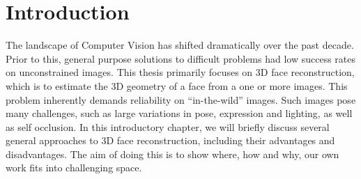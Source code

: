 \chapter{Introduction}

The landscape of Computer Vision has shifted dramatically over the
past decade. Prior to this, general purpose solutions to difficult
problems had low success rates on unconstrained images. This thesis
primarily focuses on 3D face reconstruction, which is to estimate the
3D geometry of a face from a one or more images. This problem
inherently demands reliability on ``in-the-wild'' images. Such images
pose many challenges, such as large variations in pose, expression and
lighting, as well as self occlusion. In this introductory chapter, we
will briefly discuss several general approaches to 3D face
reconstruction, including their advantages and disadvantages. The aim
of doing this is to show where, how and why, our own work fits into
challenging space.








